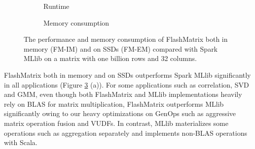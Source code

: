 \begin{figure}
	\centering
	\footnotesize
	\vspace{-15pt}
	\begin{subfigure}{.5\textwidth}
		
		\label{perf:rt}
		\vspace{-15pt}
		\caption{Runtime}
	\end{subfigure}

	\begin{subfigure}{.5\textwidth}
		
		\label{perf:mem}
		\vspace{-15pt}
		\caption{Memory consumption}
	\end{subfigure}
	\caption{The performance and memory consumption of FlashMatrix both
		in memory (FM-IM) and on SSDs (FM-EM) compared with Spark MLlib
		on a matrix with one billion rows and 32 columns.}
	\label{perf:fm}
\end{figure}

%		

FlashMatrix both in memory and on SSDs outperforms Spark MLlib significantly
in all applications (Figure \ref{perf:fm} (a)). For some applications
such as correlation, SVD and GMM, even though both FlashMatrix and MLlib
implementations heavily rely on BLAS for matrix multiplication, FlashMatrix
outperforms MLlib significantly owing to our heavy optimizations on GenOps
such as aggressive matrix operation fusion and VUDFs. In contrast, MLlib
materializes some operations such as aggregation separately and implements
non-BLAS operations with Scala.

%		

